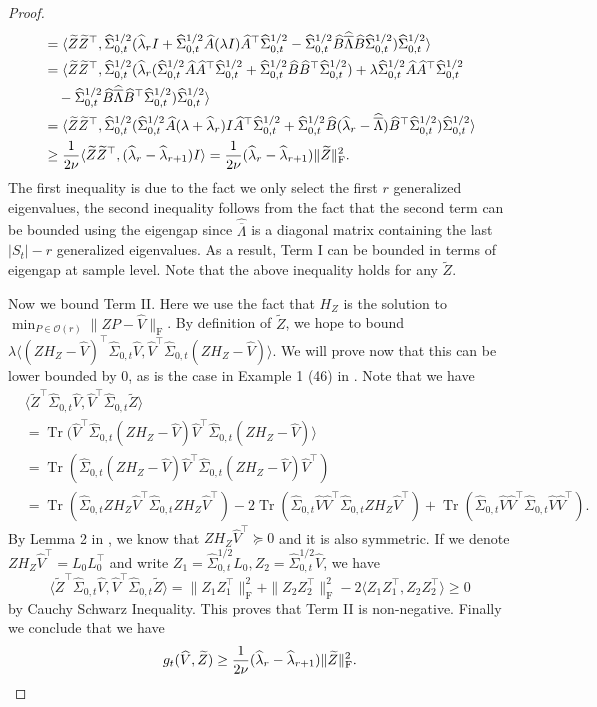 \documentclass[11pt]{article}
\newcommand{\rev}[1]{\textcolor{black}{#1}}
\newcommand{\LambdaRest}{\overline{\Lambda}} %
\newcommand{\ha}{\widehat{A}}
\newcommand{\hb}{\widehat{B}}
\newcommand{\hU}{\widehat{V}}
\newcommand{\has}{\widehat{\LambdaRest}}
\newcommand{\sot}{\widehat{\Sigma}_{0,t}}
\DeclareMathOperator{\Tr}{Tr}
\newcommand{\0}{{\mathbf{0}}}
\newcommand{\tZ}{{\widetilde{Z}}}
\begin{document}
\begin{proof}
\begin{align*}
& = \langle \tZ\tZ^\top  , \sot^{1/2}(\widehat{\lambda}_r I+\sot^{1/2}\ha (\lambda I )\ha^\top \sot^{1/2}-\sot^{1/2}\hb \has\hb \sot^{1/2})\sot^{1/2}\rangle \\
& = \langle \tZ\tZ^\top  , \sot^{1/2}(\widehat{\lambda}_r (\sot^{1/2}\ha\ha^\top  \sot^{1/2}+\sot^{1/2}\hb\hb^\top  \sot^{1/2})+\lambda\sot^{1/2}\ha \ha ^\top  \sot^{1/2}\\
& ~~~ -\sot^{1/2}\hb \has \hb^\top  \sot^{1/2})\sot^{1/2}\rangle \\
& = \langle \tZ\tZ^\top  , \sot^{1/2}(\sot^{1/2}\ha (\lambda+\widehat{\lambda}_r )I\ha ^\top  \sot^{1/2} +\sot^{1/2}\hb (\widehat{\lambda}_r -\has)\hb^\top\sot^{1/2})\sot^{1/2}\rangle \\
& \geq \frac{1}{2\rev{\nu}}\langle \tZ\tZ^\top  , (\widehat{\lambda}_r -\widehat{\lambda}_{r+1}) I\rangle = \frac{1}{2\rev{\nu}}(\widehat{\lambda}_r -\widehat{\lambda}_{r+1})\|\tZ\|_\mathrm{F}^2.
\end{align*}
The first inequality is due to the fact we only select the first $r$ generalized eigenvalues, the second inequality follows from the fact that the second term can be bounded using the eigengap since $\has$ is a diagonal matrix containing the last $|S_t| -r$ generalized eigenvalues. 
As a result, Term I can be bounded in terms of eigengap at sample level. Note that the above inequality holds for any $\tZ$. 

Now we bound Term II. Here we use the fact that $H_Z$ is the solution to $\min_{P\in\mathcal{O}(r)} \|ZP-\hU\|_\mathrm{F}$. By definition of $\tZ$, we hope to bound $\lambda\langle (ZH_Z-\widehat{V})^\top\sot \hU,\hU^\top \sot (ZH_Z-\widehat{V})\rangle.$ We will prove now that this can be lower bounded by 0, as is the case in Example 1 (46) in \cite{chi2019nonconvex}. Note that we have 
\begin{align*}
& \langle \tZ^\top\sot \hU,\hU^\top \sot \tZ\rangle\\
&=\Tr(\hU^\top\sot(ZH_Z-\widehat{V})\hU^\top \sot (ZH_Z-\widehat{V})\rangle\\
&=\Tr(\sot (ZH_Z-\hU)\hU^\top\sot (ZH_Z-\hU)\hU^\top )\\
&= \Tr(\sot ZH_Z\hU^\top\sot ZH_Z\hU^\top)-2\Tr(\sot \hU\hU^\top\sot ZH_Z\hU^\top)+\Tr(\sot \hU\hU^\top\sot \hU\hU^\top).
\end{align*}
By Lemma 2 in \cite{ten1977orthogonal}, we know that $ ZH_Z\hU^\top\succeq 0$ and it is also symmetric. 
If we denote $ZH_Z\hU^\top=L_0L_0^\top$ and write $Z_1 = \sot^{1/2}L_0, Z_2=\sot^{1/2}\hU$, we have
\begin{equation*}
\langle \tZ^\top\sot \hU,\hU^\top \sot \tZ\rangle
=\|Z_1Z_1^\top \|_\mathrm{F}^2+\|Z_2Z_2^\top\|_\mathrm{F}^2-2\langle Z_1Z_1^\top,Z_2Z_2^\top \rangle\geq 0
\end{equation*} by Cauchy Schwarz Inequality. 
This proves that Term II is non-negative. Finally we conclude that we have \begin{equation*}
g_t(\widehat{V},\tZ)\geq \frac{1}{2\rev{\nu}} (\widehat{\lambda}_r -\widehat{\lambda}_{r+1})\|\tZ\|_\mathrm{F}^2.
\end{equation*}



\end{proof}
\end{document}

